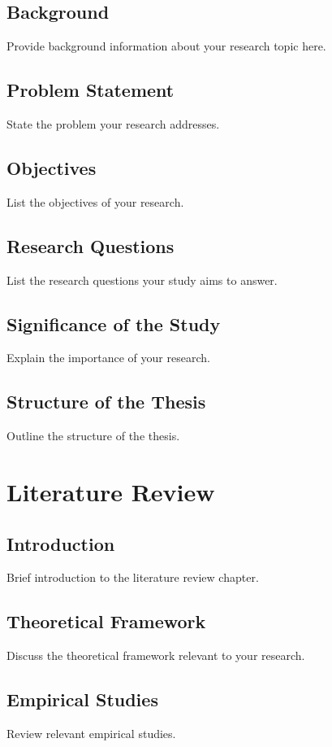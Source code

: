 \documentclass[12pt, oneside]{book}
\begin{document}
\section{Background}
Provide background information about your research topic here.

\section{Problem Statement}
State the problem your research addresses.

\section{Objectives}
List the objectives of your research.

\section{Research Questions}
List the research questions your study aims to answer.

\section{Significance of the Study}
Explain the importance of your research.

\section{Structure of the Thesis}
Outline the structure of the thesis.

\clearpage
\chapter{Literature Review}
\section{Introduction}
Brief introduction to the literature review chapter.

\section{Theoretical Framework}
Discuss the theoretical framework relevant to your research.

\section{Empirical Studies}
Review relevant empirical studies.
\end{document}
